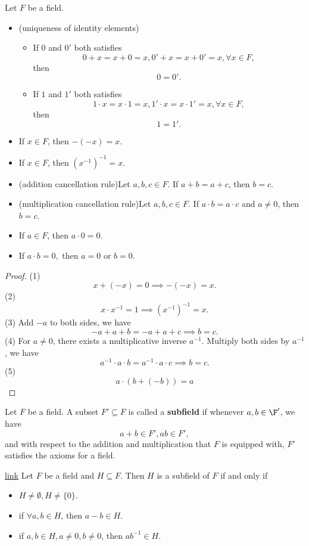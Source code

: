 \begin{refsection}
\begin{lemma}
Let $F$ be a field.
\begin{itemize}
	\item (uniqueness of identity elements)
	\begin{itemize}
		\item If $0$ and $0'$ both satisfies 
		$$0+x=x+0 = x, 0'+x=x+0'=x,\forall x \in F,$$
		then
		$$0=0'.$$
		\item If $1$ and $1'$ both satisfies 
		$$1\cdot x=x\cdot 1 = x, 1'\cdot x=x\cdot 1' = x,\forall x \in F,$$
		then
		$$1=1'.$$
	\end{itemize}
	\item If $x\in F$, then $-(-x) = x$.
	\item If $x\in F$, then $(x^{-1})^{-1}=x.$
	\item (addition cancellation rule)Let $a,b,c\in F$. If $a+b = a+c$, then $b=c$.
	\item (multiplication cancellation rule)Let $a,b,c\in F$. If $a\cdot b = a\cdot c$ and $a\neq 0$, then 
	$b=c$.
	\item If $a\in F$, then $a\cdot 0 = 0.$
	\item If $a\cdot b = 0,$ then $a = 0$ or $b = 0$.
\end{itemize}	
\end{lemma}
\begin{proof}
(1)
$$x + (-x) = 0 \implies -(-x) = x .$$
(2) 
$$x\cdot x^{-1} = 1\implies (x^{-1})^{-1}=x. $$
(3)
Add $-a$ to both sides, we have
$$-a +a +b = -a + a + c\implies b = c.$$
(4)
For $a\neq 0$, there exists a multiplicative inverse $a^{-1}$. 
Multiply both sides by $a^{-1}$, we have
$$a^{-1}\cdot a\cdot b =a^{-1}\cdot a\cdot c \implies b = c.$$
(5)
$$a\cdot(b + (-b)) = a$$
\end{proof}


\begin{definition}[subfield]
Let $F$ be a field. A subset $F'\subseteq F$ is called a \textbf{subfield} if whenever $a,b\in \F'$, we have $$a+b \in F', ab\in F', $$
and with respect to the addition and multiplication that $F$ is equipped with, $F'$ satisfies the axioms for a field.
\end{definition}

\begin{lemma}\href{https://math.stackexchange.com/questions/95264/necessary-and-sufficient-condition-for-a-sub-field}{link}
Let  $F$ be a field and	$H\subseteq F$. Then $H$ is a subfield of $F$ if and only if
\begin{itemize}
	\item $H \neq \emptyset, H\neq \{0\}$.
	\item if $\forall a,b \in H$, then $a -b \in H$.
	\item if $a,b\in H, a\neq 0, b\neq 0$, then $ab^{-1} \in H$.
\end{itemize}
\end{lemma}



\end{refsection}
